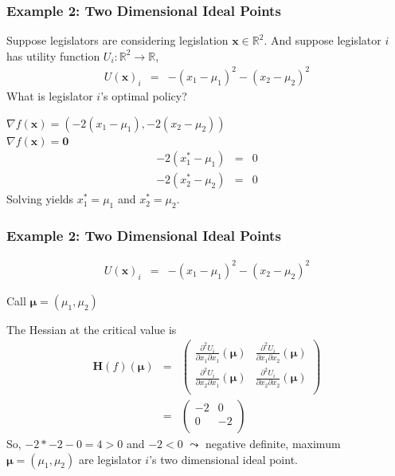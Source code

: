 \documentclass{beamer}
\numberwithin{equation}{section}
\begin{document}
\begin{frame}
\frametitle{Example 2: Two Dimensional Ideal Points}
Suppose legislators are considering legislation $\boldsymbol{x} \in \mathbb{R}^{2}$.  And suppose legislator $i$ has utility function $U_{i}: \mathbb{R}^{2} \rightarrow \mathbb{R}$, \pause
\begin{eqnarray}
U(\boldsymbol{x})_{i} & = & - (x_{1} - \mu_{1})^2 - (x_{2} - \mu_{2})^2 \nonumber 
\end{eqnarray} \pause
What is legislator $i$'s optimal policy? \pause

$\nabla f(\boldsymbol{x}) = ( -2 (x_{1} - \mu_{1} ) , -2 (x_{2} - \mu_{2} )  )$\\
$\nabla f(\boldsymbol{x}) = \boldsymbol{0} $ \pause
\begin{eqnarray}
- 2(x_{1}^{*} - \mu_{1} ) & = & 0 \nonumber \\
- 2(x_{2}^{*} - \mu_{2} ) & = & 0 \nonumber 
\end{eqnarray}  \pause
Solving yields $x_{1}^{*} = \mu_{1}$ and $x_{2}^{*} = \mu_{2}$.  

\end{frame}



\begin{frame}
\frametitle{Example 2: Two Dimensional Ideal Points} 

\begin{eqnarray}
U(\boldsymbol{x})_{i} & = & - (x_{1} - \mu_{1})^2 - (x_{2} - \mu_{2})^2 \nonumber 
\end{eqnarray} \pause

Call $\boldsymbol{\mu} = (\mu_{1}, \mu_{2} ) $\\ \pause

The Hessian at the critical value is \pause
\begin{eqnarray}
\boldsymbol{H}(f)(\boldsymbol{\mu} ) & = & \begin{pmatrix} 
\frac{\partial^{2} U_{i}} {\partial x_{1} \partial x_{1}} (\boldsymbol{\mu} ) & \frac{\partial^{2} U_{i}} {\partial x_{1} \partial x_{2}} (\boldsymbol{\mu} )  \\
\frac{\partial^{2} U_{i}} {\partial x_{2} \partial x_{1}} (\boldsymbol{\mu} ) & \frac{\partial^{2} U_{i}} {\partial x_{2} \partial x_{2}} (\boldsymbol{\mu} )\\
\end{pmatrix} \nonumber \\
& = & \begin{pmatrix} 
-2 & 0  \\
0 & -2  \\
\end{pmatrix} 
\nonumber 
\end{eqnarray} \pause
So, $-2 * -2 - 0  = 4 >0$ and $-2 <0$ $\leadsto$ \alert{negative definite}, \alert{maximum} \\
$\boldsymbol{\mu} = (\mu_{1}, \mu_{2})$ are legislator $i$'s two dimensional ideal point.  

\end{frame}
\end{document}
